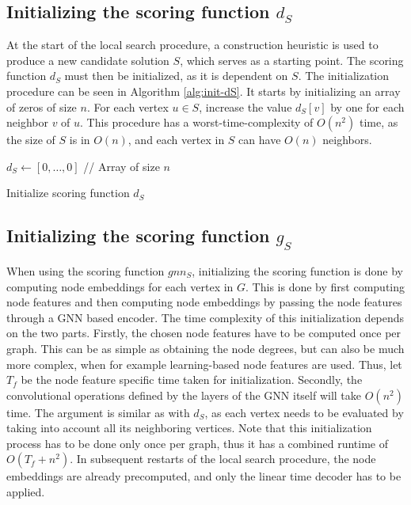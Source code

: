 \documentclass[draft,final]{vutinfth} %
\begin{document}
\subsection{Initializing the scoring function $d_S$}

At the start of the local search procedure, a construction heuristic is used to produce a new candidate solution $S$, which serves as a starting point. 
The scoring function $d_S$ must then be initialized, as it is dependent on $S$. The initialization procedure can be seen in Algorithm \ref{alg:init-dS}.
It starts by initializing an array of zeros of size $n$. For each vertex $u \in S$, increase the value $d_S[v]$ by one for each neighbor $v$ of $u$. This procedure has a worst-time-complexity of $O(n^2)$ time, as the size of $S$ is in $O(n)$, and each vertex in $S$ can have $O(n)$ neighbors. 

\begin{algorithm}
    \DontPrintSemicolon
    $d_S \gets [0, \dots, 0]$ // Array of size $n$ \;
    \caption{Initialize scoring function $d_S$}
    \label{alg:init-dS}
\end{algorithm}

\subsection{Initializing the scoring function $g_S$}

When using the scoring function $gnn_S$, initializing the scoring function is done by computing node embeddings for each vertex in $G$. This is done by first computing node features and then computing node embeddings by passing the node features through a GNN based encoder. The time complexity of this initialization depends on the two parts. Firstly, the chosen node features have to be computed once per graph. This can be as simple as obtaining the node degrees, but can also be much more complex, when for example learning-based node features are used. Thus, let $T_f$ be the node feature specific time taken for initialization.  Secondly, the convolutional operations defined by the layers of the GNN itself will take $O(n^2)$ time. The argument is similar as with $d_S$, as each vertex needs to be evaluated by taking into account all its neighboring vertices. 
Note that this initialization process has to be done only once per graph, thus it has a combined runtime of $O(T_f + n^2)$. In subsequent restarts of the local search procedure, the node embeddings are already precomputed, and only the linear time decoder has to be applied. 
\end{document}
